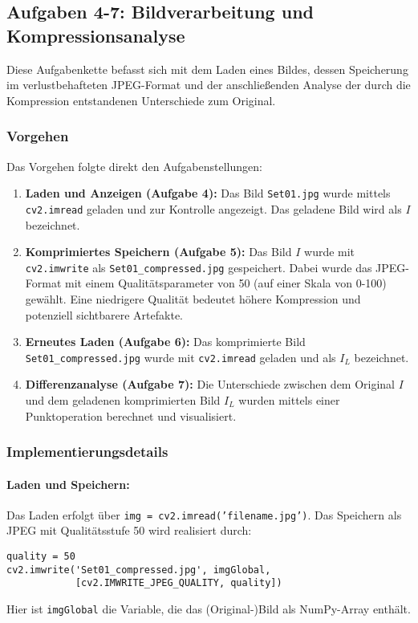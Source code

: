 \documentclass[titlepage]{article}
\begin{document}
\subsection{Aufgaben 4-7: Bildverarbeitung und Kompressionsanalyse}
Diese Aufgabenkette befasst sich mit dem Laden eines Bildes, dessen Speicherung im verlustbehafteten JPEG-Format und der anschließenden Analyse der durch die Kompression entstandenen Unterschiede zum Original.

\subsubsection{Vorgehen}
Das Vorgehen folgte direkt den Aufgabenstellungen:
\begin{enumerate}
    \item \textbf{Laden und Anzeigen (Aufgabe 4):} Das Bild \texttt{Set01.jpg} wurde mittels \texttt{cv2.imread} geladen und zur Kontrolle angezeigt. Das geladene Bild wird als $I$ bezeichnet.
    \item \textbf{Komprimiertes Speichern (Aufgabe 5):} Das Bild $I$ wurde mit \\ \texttt{cv2.imwrite} als \texttt{Set01\_compressed.jpg} gespeichert. Dabei wurde das JPEG-Format mit einem Qualitätsparameter von 50 (auf einer Skala von 0-100) gewählt. Eine niedrigere Qualität bedeutet höhere Kompression und potenziell sichtbarere Artefakte.
    \item \textbf{Erneutes Laden (Aufgabe 6):} Das komprimierte Bild \texttt{Set01\_compressed.jpg} wurde mit \texttt{cv2.imread} geladen und als $I_L$ bezeichnet.
    \item \textbf{Differenzanalyse (Aufgabe 7):} Die Unterschiede zwischen dem Original $I$ und dem geladenen komprimierten Bild $I_L$ wurden mittels einer Punktoperation berechnet und visualisiert.
\end{enumerate}

\subsubsection{Implementierungsdetails}
\paragraph{Laden und Speichern:}
Das Laden erfolgt über \texttt{img = cv2.imread('filename.jpg')}. Das Speichern als JPEG mit Qualitätsstufe 50 wird realisiert durch:
\begin{lstlisting}[caption={Speichern eines Bildes als JPEG mit Qualitätsstufe 50}]
quality = 50
cv2.imwrite('Set01_compressed.jpg', imgGlobal, 
            [cv2.IMWRITE_JPEG_QUALITY, quality])
\end{lstlisting}
Hier ist \texttt{imgGlobal} die Variable, die das (Original-)Bild als NumPy-Array enthält.
\end{document}
